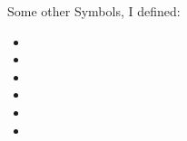 \documentclass[a4paper]{article}%
\begin{document}
\npi
Some other Symbols, I defined:
\begin{itemize}[label=,leftmargin=0pt]
\item
    \DenKrKomaHeadingAsterisk
\item
    \DenKrKomaHeadingPointRightA
    \hspace{0.5em}%
    \DenKrKomaHeadingPointRightB
\item
    \DenKrKomaHeadingTildeUp
    \hspace{0.5em}%
    \DenKrKomaHeadingTildeUpRotate
    \hspace{0.5em}%
    \DenKrKomaHeadingTildeDown
    \hspace{0.5em}%
    \DenKrKomaHeadingTildeDownRotateChar
\item
    \DenKrKomaHeadingTildeCross
    \hspace{0.5em}%
    \DenKrKomaHeadingTildeCrossRotate
\item
    \DenKrKomaHeadingTildeDouble
    \hspace{0.5em}%
    \DenKrKomaHeadingTildeDoubleRotate
\item
    \DenKrKomaHeadingSeedA
\end{itemize}





\end{document}
